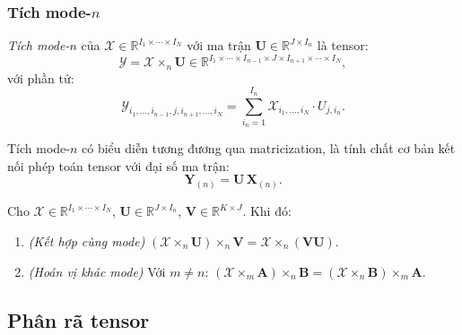 \subsubsection{\texorpdfstring{Tích mode-$n$}{Tích mode-n}}

\begin{definition}
\textit{Tích mode-$n$} của $\mathcal{X} \in \mathbb{R}^{I_1 \times \cdots \times I_N}$ với ma trận $\mathbf{U} \in \mathbb{R}^{J \times I_n}$ là tensor:
\begin{equation}
    \mathcal{Y} = \mathcal{X} \times_n \mathbf{U} \in \mathbb{R}^{I_1 \times \cdots \times I_{n-1} \times J \times I_{n+1} \times \cdots \times I_N},
\end{equation}
với phần tử:
\begin{equation}
    \mathcal{Y}_{i_1,\ldots,i_{n-1},j,i_{n+1},\ldots,i_N} = \sum_{i_n=1}^{I_n} \mathcal{X}_{i_1,\ldots,i_N} \cdot U_{j,i_n}.
\end{equation}
\end{definition}

Tích mode-$n$ có biểu diễn tương đương qua matricization, là tính chất cơ bản kết nối phép toán tensor với đại số ma trận:
\begin{equation}
    \mathbf{Y}_{(n)} = \mathbf{U}\, \mathbf{X}_{(n)}.
\end{equation}

\begin{proposition}
\label{prop:mode-n}
Cho $\mathcal{X} \in \mathbb{R}^{I_1 \times \cdots \times I_N}$, $\mathbf{U} \in \mathbb{R}^{J \times I_n}$, $\mathbf{V} \in \mathbb{R}^{K \times J}$. Khi đó:
\begin{enumerate}[label=(\roman*)]
    \item \textit{(Kết hợp cùng mode)} $(\mathcal{X} \times_n \mathbf{U}) \times_n \mathbf{V} = \mathcal{X} \times_n (\mathbf{V}\mathbf{U})$.
    \item \textit{(Hoán vị khác mode)} Với $m \neq n$: $(\mathcal{X} \times_m \mathbf{A}) \times_n \mathbf{B} = (\mathcal{X} \times_n \mathbf{B}) \times_m \mathbf{A}$.
\end{enumerate}
\end{proposition}

\subsection{Phân rã tensor}

